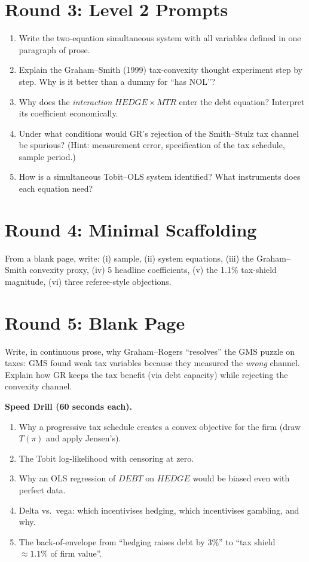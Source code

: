 \documentclass[11pt]{article}
\begin{document}
\section*{Round 3: Level 2 Prompts}
\begin{enumerate}
\item Write the two-equation simultaneous system with all variables defined in one paragraph of prose.
\item Explain the Graham--Smith (1999) tax-convexity thought experiment step by step. Why is it better than a dummy for ``has NOL''?
\item Why does the \emph{interaction} $HEDGE \times MTR$ enter the debt equation? Interpret its coefficient economically.
\item Under what conditions would GR's rejection of the Smith--Stulz tax channel be spurious? (Hint: measurement error, specification of the tax schedule, sample period.)
\item How is a simultaneous Tobit--OLS system identified? What instruments does each equation need?
\end{enumerate}

\section*{Round 4: Minimal Scaffolding}
From a blank page, write: (i) sample, (ii) system equations, (iii) the Graham--Smith convexity proxy, (iv) 5 headline coefficients, (v) the 1.1\% tax-shield magnitude, (vi) three referee-style objections.

\section*{Round 5: Blank Page}
Write, in continuous prose, why Graham--Rogers ``resolves'' the GMS puzzle on taxes: GMS found weak tax variables because they measured the \emph{wrong} channel. Explain how GR keeps the tax benefit (via debt capacity) while rejecting the convexity channel.

\vspace{6pt}
\begin{drillbox}
\textbf{Speed Drill (60 seconds each).}
\begin{enumerate}
\item Why a progressive tax schedule creates a convex objective for the firm (draw $T(\pi)$ and apply Jensen's).
\item The Tobit log-likelihood with censoring at zero.
\item Why an OLS regression of $DEBT$ on $HEDGE$ would be biased even with perfect data.
\item Delta vs.\ vega: which incentivises hedging, which incentivises gambling, and why.
\item The back-of-envelope from ``hedging raises debt by 3\%'' to ``tax shield $\approx 1.1\%$ of firm value''.
\end{enumerate}
\end{drillbox}
\end{document}
